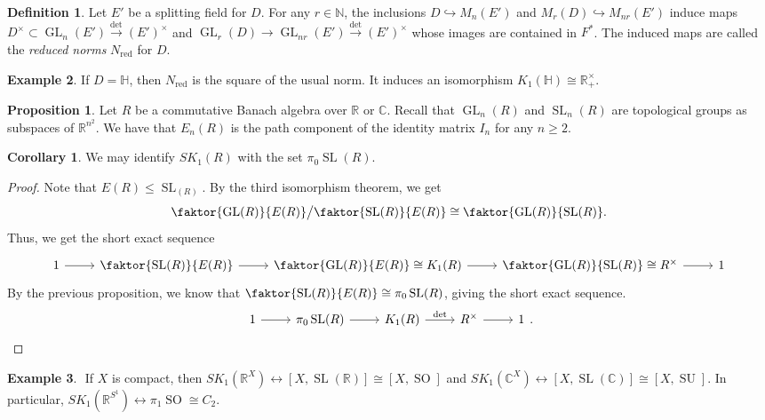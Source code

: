 \documentclass[10pt,letterpaper,cm]{nupset}
\theoremstyle{definition}
\newtheorem{definition}{Definition}
\newtheorem{exmp}[definition]{Example}
\theoremstyle{theorem}
\newtheorem{prop}[theorem]{Proposition}
\newtheorem{corollary}[theorem]{Corollary}
\theoremstyle{remark}
\newcommand{\C}{\mathbb C}
\renewcommand{\H}{\mathbb H}
\newcommand{\N}{\mathbb N}
\newcommand{\R}{\mathbb R}
\newcommand{\1}{\mathbf{1}}
\newcommand{\0}{\vec 0}
\DeclareMathOperator*{\GL}{GL}
\DeclareMathOperator*{\SL}{SL}
\DeclareMathOperator*{\SO}{SO}
\DeclareMathOperator*{\SU}{SU}
\DeclareMathOperator{\red}{red}
\begin{document}
\begin{definition}
Let $E'$ be a splitting field for $D$. For any $r \in \N$, the inclusions $D \hookrightarrow M_n(E')$ and $M_r(D) \hookrightarrow M_{nr}(E')$ induce maps $D^{\times}\subset \GL_n(E') \overset{\det}{\longrightarrow} (E')^{\times}$ and $\GL_r(D)\to \GL_{nr}(E')  \overset{\det}{\longrightarrow} (E')^{\times}$ whose images are contained in $F^{\ast}$. The induced maps are called the \textit{reduced norms} $N_{\red}$ for $D$.
\end{definition}

\begin{exmp}
If $D = \H$, then $N_{\red}$ is the square of the usual norm. It induces an isomorphism $K_1(\H) \cong \R_+^{\times}$.
\end{exmp}

\begin{prop}
Let $R$ be a commutative Banach algebra over $\R$ or $\C$. Recall that $\GL_n(R)$ and $\SL_n(R)$ are topological groups as subspaces of $\R^{n^2}$. We have that $E_n(R)$ is the path component of the identity matrix $I_n$ for any $n\geq 2$.
\end{prop}

\begin{corollary}
We may identify $SK_1(R)$ with the set $\pi_0\SL(R)$. 
\end{corollary}
\begin{proof}
Note that $E(R)\leq \SL_(R)$. By the third isomorphism theorem, we get $$ \faktor{\GL(R)}{E(R)}\big / \faktor{\SL(R)}{E(R)} \cong \faktor{\GL(R)}{\SL(R)}.$$ Thus, we get the short exact sequence 
\[
\begin{tikzcd}
1 \arrow[r] & \faktor{\SL(R)}{E(R)} \arrow[r] & \faktor{\GL(R)}{E(R)}\cong K_1(R) \arrow[r] & \faktor{\GL(R)}{\SL(R)} \cong R^{\times} \arrow[r] & 1
\end{tikzcd}
\]
By the previous proposition, we know that $\faktor{\SL(R)}{E(R)} \cong \pi_0\SL(R)$, giving the short exact sequence.
\[
\begin{tikzcd}
1 \arrow[r] & \pi_0\SL(R) \arrow[r] & K_1(R) \arrow[r, "\det"] & R^{\times} \arrow[r] & 1
\end{tikzcd}.
\]
\end{proof}
\begin{exmp} $ $
If $X$ is compact, then $SK_1(\R^X) \leftrightarrow [X, \SL(\R)] \cong [X, \SO]$ and $SK_1(\C^X) \leftrightarrow [X, \SL(\C)] \cong [X, \SU]$.
In particular, $SK_1(\R^{S^1}) \leftrightarrow \pi_1 \SO \cong C_2$.
\end{exmp}
\end{document}
